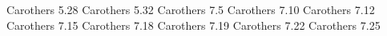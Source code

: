 \documentclass[minion]{homework641}
\begin{document}
\begin{aproblems}

\hproblem Carothers 5.28
\hproblem Carothers 5.32
\hproblem Carothers 7.5
\hproblem Carothers 7.10
\hproblem Carothers 7.12
\hproblem Carothers 7.15
\hproblem Carothers 7.18
\hproblem Carothers 7.19
\hproblem Carothers 7.22
\hproblem Carothers 7.25

\end{aproblems}
\end{document}
